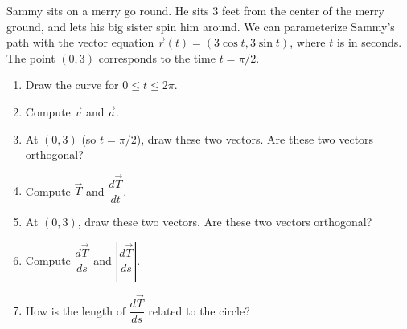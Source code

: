 \begin{problem}
 Sammy sits on a merry go round. He sits 3 feet from the center of the merry ground, and lets his big sister spin him around. We can parameterize Sammy's path with the vector equation $\vec r(t) = (3\cos t, 3\sin t)$, where $t$ is in seconds.  The point $(0,3)$ corresponds to the time $t=\pi/2$.
\begin{enumerate}
	\item Draw the curve for $0\leq t\leq 2\pi$. 
	\item Compute $\vec v$ and $\vec a$. 
	\item At $(0,3)$ (so $t=\pi/2$), draw these two vectors. Are these two vectors orthogonal? 
	\item Compute $\vec T$ and $\dfrac{d\vec T}{dt}$. 
	\item At $(0,3)$, draw these two vectors. Are these two vectors orthogonal? 
	\item Compute $\dfrac{d\vec T}{ds}$ and $\left|\dfrac{d\vec T}{ds}\right|$. 
	\item How is the length of $\dfrac{d\vec T}{ds}$ related to the circle?  
\end{enumerate}
\end{problem}

%

